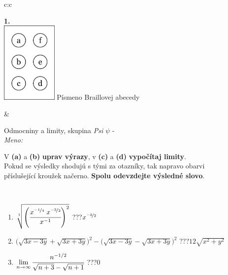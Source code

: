 \documentclass[10pt]{report}
\begin{document}
\begin{tabular}{c:c}
\begin{minipage}[c][104.5mm][t]{0.5\linewidth}
\begin{center}
\begin{minipage}{0.20\linewidth}
\begin{center}
{\Huge\bfseries 1.} \\[2mm]
\includegraphics[height=40mm]{../images/braille.png}
{\small Písmeno Braillovej abecedy}
\end{center}
\end{minipage}
\end{center}
\end{minipage}
&
\begin{minipage}[c][104.5mm][t]{0.5\linewidth}
\begin{center}
\vspace{7mm}
{\huge Odmocniny a limity, skupina \textit{Psi $\psi$} -}\\[5mm]
\textit{Meno:}\phantom{xxxxxxxxxxxxxxxxxxxxxxxxxxxxxxxxxxxxxxxxxxxxxxxxxxxxxxxxxxxxxxxxx}\\[5mm]
\begin{minipage}{0.95\linewidth}
\begin{center}
V \textbf{(a)} a \textbf{(b)} \textbf{uprav výrazy}, v \textbf{(c)} a \textbf{(d)} \textbf{vypočítaj limity}.\\Pokud se výsledky shodujú s tými za otazníky, tak napravo obarvi\\příslušející kroužek načerno. \textbf{Spolu odevzdejte výsledné slovo}.
\end{center}
\end{minipage}
\\[1mm]
\begin{minipage}{0.79\linewidth}
\begin{center}
\begin{varwidth}{\linewidth}
\begin{enumerate}
\small
\item $\sqrt[1]{\left(\cfrac{x^{\nicefrac{-1}{4}}\;x^{\nicefrac{-3}{2}}}{x^{-1}}\right)^{2}}$\quad \dotfill\; ???\;\dotfill \quad $x^{\nicefrac{-3}{2}}$
\item {\footnotesize{\scriptsize$\big(\sqrt{3x-3y}+\sqrt{3x+3y}\big)^2-\big(\sqrt{3x-3y}-\sqrt{3x+3y}\big)^2$}\quad \dotfill\; ???\;\dotfill \quad $12\sqrt{x^2+y^2}$}
\item $\lim\limits_{n\to\infty}\cfrac{n^{-1/2}}{\sqrt{n+3}-\sqrt{n+1}}$\quad \dotfill\; ???\;\dotfill \quad $0$

\end{enumerate}
\end{varwidth}
\end{center}
\end{minipage}
\end{center}
\end{minipage}
\end{tabular}
\end{document}
